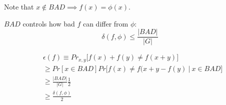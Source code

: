 Note that $x \notin BAD \implies f(x) = \phi(x)$.

$BAD$ controls how bad $f$ can differ from $\phi$:
$$\delta(f, \phi) \leq \frac{|BAD|}{|G|}$$


\begin{align*}
&\epsilon(f) \equiv Pr_{x, y} \bigg [ f(x) + f(y) \neq f(x + y) \bigg] \\
&\geq Pr  [ x \in BAD] Pr \bigg [f(x) \neq f(x + y - f(y) ~ \bigg\vert ~ x \in BAD \bigg] \\
&\geq \frac{|BAD|}{|G|} \frac{1}{2}  \\
&\geq \frac{\delta(f, \phi)}{2} \\
\end{align*}
